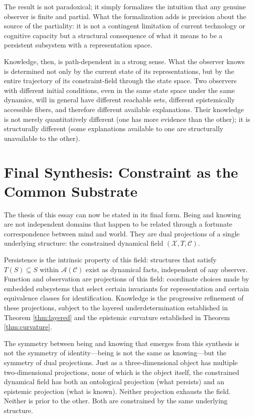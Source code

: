 \documentclass[12pt, a4paper, oneside]{article}
\theoremstyle{plain}
\theoremstyle{definition}
\theoremstyle{remark}
\newcommand{\X}{\mathcal{X}}
\newcommand{\C}{\mathcal{C}}
\newcommand{\A}{\mathcal{A}}
\newcommand{\T}{T}
\begin{document}
The result is not paradoxical; it simply formalizes the intuition that any genuine observer is finite and partial. What the formalization adds is precision about the source of the partiality: it is not a contingent limitation of current technology or cognitive capacity but a structural consequence of what it means to be a persistent subsystem with a representation space.

Knowledge, then, is path-dependent in a strong sense. What the observer knows is determined not only by the current state of its representations, but by the entire trajectory of its constraint-field through the state space. Two observers with different initial conditions, even in the same state space under the same dynamics, will in general have different reachable sets, different epistemically accessible fibers, and therefore different available explanations. Their knowledge is not merely quantitatively different (one has more evidence than the other); it is structurally different (some explanations available to one are structurally unavailable to the other).

\section{Final Synthesis: Constraint as the Common Substrate}

The thesis of this essay can now be stated in its final form. Being and knowing are not independent domains that happen to be related through a fortunate correspondence between mind and world. They are dual projections of a single underlying structure: the constrained dynamical field $(\X, \T, \C)$.

Persistence is the intrinsic property of this field: structures that satisfy $\T(S) \subseteq S$ within $\A(\C)$ exist as dynamical facts, independent of any observer. Function and observation are projections of this field: coordinate choices made by embedded subsystems that select certain invariants for representation and certain equivalence classes for identification. Knowledge is the progressive refinement of these projections, subject to the layered underdetermination established in Theorem \ref{thm:layered} and the epistemic curvature established in Theorem \ref{thm:curvature}.

The symmetry between being and knowing that emerges from this synthesis is not the symmetry of identity---being is not the same as knowing---but the symmetry of dual projections. Just as a three-dimensional object has multiple two-dimensional projections, none of which is the object itself, the constrained dynamical field has both an ontological projection (what persists) and an epistemic projection (what is known). Neither projection exhausts the field. Neither is prior to the other. Both are constrained by the same underlying structure.
\end{document}
